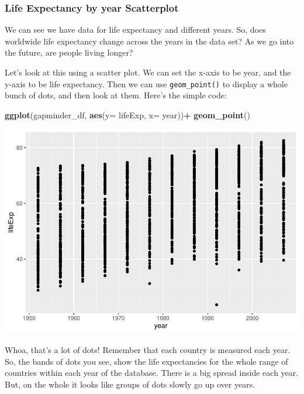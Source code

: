 \documentclass[]{book}
\newenvironment{Shaded}{\begin{snugshade}}{\end{snugshade}}
\newcommand{\KeywordTok}[1]{\textcolor[rgb]{0.13,0.29,0.53}{\textbf{#1}}}
\newcommand{\DataTypeTok}[1]{\textcolor[rgb]{0.13,0.29,0.53}{#1}}
\newcommand{\StringTok}[1]{\textcolor[rgb]{0.31,0.60,0.02}{#1}}
\newcommand{\OperatorTok}[1]{\textcolor[rgb]{0.81,0.36,0.00}{\textbf{#1}}}
\newcommand{\NormalTok}[1]{#1}
\begin{document}
\subsubsection{Life Expectancy by year
Scatterplot}\label{life-expectancy-by-year-scatterplot}

We can see we have data for life expectancy and different years. So,
does worldwide life expectancy change across the years in the data set?
As we go into the future, are people living longer?

Let's look at this using a scatter plot. We can set the x-axis to be
year, and the y-axis to be life expectancy. Then we can use
\texttt{geom\_point()} to display a whole bunch of dots, and then look
at them. Here's the simple code:

\begin{Shaded}
\begin{Highlighting}[]
\KeywordTok{ggplot}\NormalTok{(gapminder_df, }\KeywordTok{aes}\NormalTok{(}\DataTypeTok{y=}\NormalTok{ lifeExp, }\DataTypeTok{x=}\NormalTok{ year))}\OperatorTok{+}
\StringTok{  }\KeywordTok{geom_point}\NormalTok{()}
\end{Highlighting}
\end{Shaded}

\includegraphics{Statistics_Lab_files/figure-latex/1scatterplot-1.pdf}

Whoa, that's a lot of dots! Remember that each country is measured each
year. So, the bands of dots you see, show the life expectancies for the
whole range of countries within each year of the database. There is a
big spread inside each year. But, on the whole it looks like groups of
dots slowly go up over years.
\end{document}
